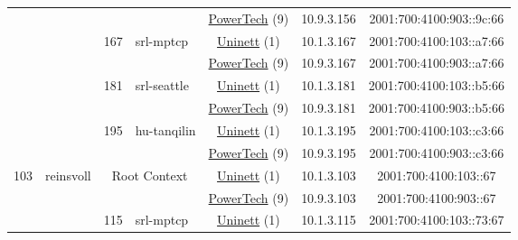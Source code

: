 \begin{small}
\begin{center}
\begin{longtable}{|c|c|c|c|c|c|c|c|}
  &  &  &  & \multicolumn{2}{|c|}{\tiny{\href{http://www.powertech.no}{PowerTech} (9)}} & \tiny{10.9.3.156} & \tiny{2001:700:4100:903::9c:66} \\* \cline{3-3}\cline{4-4}\cline{5-5}\cline{6-6}\cline{7-7}\cline{8-8}
  &  & \multirow{2}{*}{\tiny{167}} & \multicolumn{1}{|l|}{\multirow{2}{*}{\tiny{srl-mptcp}}} & \multicolumn{2}{|c|}{\tiny{\href{https://www.uninett.no}{Uninett} (1)}} & \tiny{10.1.3.167} & \tiny{2001:700:4100:103::a7:66} \\* \cline{5-5}\cline{6-6}\cline{7-7}\cline{8-8}
  &  &  &  & \multicolumn{2}{|c|}{\tiny{\href{http://www.powertech.no}{PowerTech} (9)}} & \tiny{10.9.3.167} & \tiny{2001:700:4100:903::a7:66} \\* \cline{3-3}\cline{4-4}\cline{5-5}\cline{6-6}\cline{7-7}\cline{8-8}
  &  & \multirow{2}{*}{\tiny{181}} & \multicolumn{1}{|l|}{\multirow{2}{*}{\tiny{srl-seattle}}} & \multicolumn{2}{|c|}{\tiny{\href{https://www.uninett.no}{Uninett} (1)}} & \tiny{10.1.3.181} & \tiny{2001:700:4100:103::b5:66} \\* \cline{5-5}\cline{6-6}\cline{7-7}\cline{8-8}
  &  &  &  & \multicolumn{2}{|c|}{\tiny{\href{http://www.powertech.no}{PowerTech} (9)}} & \tiny{10.9.3.181} & \tiny{2001:700:4100:903::b5:66} \\* \cline{3-3}\cline{4-4}\cline{5-5}\cline{6-6}\cline{7-7}\cline{8-8}
  &  & \multirow{2}{*}{\tiny{195}} & \multicolumn{1}{|l|}{\multirow{2}{*}{\tiny{hu-tanqilin}}} & \multicolumn{2}{|c|}{\tiny{\href{https://www.uninett.no}{Uninett} (1)}} & \tiny{10.1.3.195} & \tiny{2001:700:4100:103::c3:66} \\* \cline{5-5}\cline{6-6}\cline{7-7}\cline{8-8}
  &  &  &  & \multicolumn{2}{|c|}{\tiny{\href{http://www.powertech.no}{PowerTech} (9)}} & \tiny{10.9.3.195} & \tiny{2001:700:4100:903::c3:66} \\ \hline
 \multirow{30}{*}{\tiny{103}} & \multicolumn{1}{|l|}{\multirow{30}{*}{\tiny{reinsvoll}}} & \multicolumn{2}{|c|}{\multirow{2}{*}{\tiny{Root Context}}} & \multicolumn{2}{|c|}{\tiny{\href{https://www.uninett.no}{Uninett} (1)}} & \tiny{10.1.3.103} & \tiny{2001:700:4100:103::67} \\* \cline{5-5}\cline{6-6}\cline{7-7}\cline{8-8}
  &  & \multicolumn{2}{|c|}{} & \multicolumn{2}{|c|}{\tiny{\href{http://www.powertech.no}{PowerTech} (9)}} & \tiny{10.9.3.103} & \tiny{2001:700:4100:903::67} \\* \cline{3-3}\cline{4-4}\cline{5-5}\cline{6-6}\cline{7-7}\cline{8-8}
  &  & \multirow{2}{*}{\tiny{115}} & \multicolumn{1}{|l|}{\multirow{2}{*}{\tiny{srl-mptcp}}} & \multicolumn{2}{|c|}{\tiny{\href{https://www.uninett.no}{Uninett} (1)}} & \tiny{10.1.3.115} & \tiny{2001:700:4100:103::73:67} \\* \cline{5-5}\cline{6-6}\cline{7-7}\cline{8-8}

\end{longtable}
\end{center}
\end{small}
